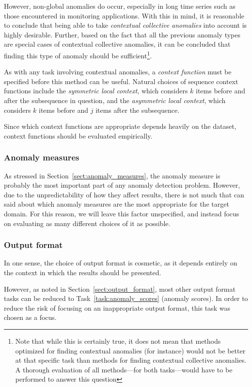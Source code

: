 However, non-global anomalies do occur, especially in long time series such as those encountered in monitoring applications. With this in mind, it is reasonable to conclude that being able to take \emph{contextual collective anomalies} into account is highly desirable. Further, based on the fact that all the previous anomaly types are special cases of contextual collective anomalies, it can be concluded that finding this type of anomaly should be sufficient\footnote{Note that while this is certainly true, it does not mean that methods optimized for finding contextual anomalies (for instance) would not be better at that specific task than methods for finding contextual collective anomalies. A thorough evaluation of all methods---for both tasks---would have to be performed to answer this question}.

As with any task involving contextual anomalies, a \emph{context function} must be specified before this method can be useful. Natural choices of sequence context functions include the \emph{symmetric local context}, which considers $k$ items before and after the subsequence in question, and the \emph{asymmetric local context}, which considers $k$ items before and $j$ items after the subsequence.

Since which context functions are appropriate depends heavily on the dataset, context functions should be evaluated empirically.

\subsubsection{Anomaly measures}

As stressed in Section~\ref{sect:anomaly_measures}, the anomaly measure is probably the most important part of any anomaly detection problem. However, due to the unpredictability of how they affect results, there is not much that can said about which anomaly measures are the most appropriate for the target domain. For this reason, we will leave this factor unspecified, and instead focus on evaluating as many different choices of it as possible.

\subsubsection{Output format}

In one sense, the choice of output format is cosmetic, as it depends entirely on the context in which the results should be presented. 

However, as noted in Section~\ref{sect:output_format}, most other output format tasks can be reduced to Task~\ref{task:anomaly_scores} (anomaly scores). In order to reduce the risk of focusing on an inappropriate output format, this task was chosen as a focus.


